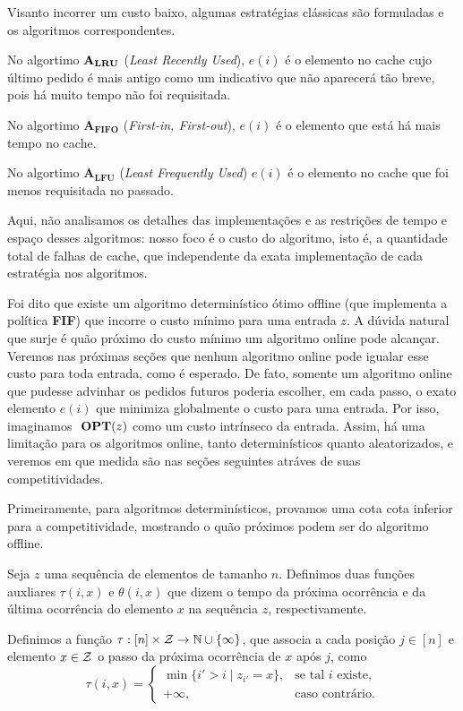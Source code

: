 Visanto incorrer um custo baixo, algumas estratégias clássicas são formuladas e os algoritmos correspondentes.  

No algortimo \(\mathbf{A_{LRU}}\) (\textit{Least Recently Used}), \(e(i)\) é o elemento no cache cujo último pedido é mais antigo como um indicativo que não aparecerá tão breve, pois há muito tempo não foi requisitada.

No algortimo \(\mathbf{A_{FIFO}}\) (\textit{First-in, First-out}), \(e(i)\) é o elemento que está há mais tempo no cache. 

No algortimo \(\mathbf{A_{LFU}}\) (\textit{Least Frequently Used}) \(e(i)\) é o elemento no cache que foi menos requisitada no passado.

Aqui, não analisamos os detalhes das implementações e as restrições de tempo e espaço desses algoritmos: nosso foco é o custo do algoritmo, isto é, a quantidade total de falhas de cache, que independente da exata implementação de cada estratégia nos algoritmos.

Foi dito que existe um algoritmo determinístico ótimo offline (que implementa a política \textbf{FIF}) que incorre o custo mínimo para uma entrada \(z\). A dúvida natural que surje é quão próximo do custo mínimo um algoritmo online pode alcançar. Veremos nas próximas seções que nenhum algoritmo online pode igualar esse custo para toda entrada, como é esperado. De fato, somente um algoritmo online que pudesse advinhar os pedidos futuros poderia escolher, em cada passo, o exato elemento \(e(i)\) que minimiza globalmente o custo para uma entrada. Por isso, imaginamos \(\ \textbf{OPT}(z)\) como um custo intrínseco da entrada. Assim, há uma limitação para os algoritmos online, tanto determinísticos quanto aleatorizados, e veremos em que medida são nas seções seguintes atráves de suas competitividades.

Primeiramente, para algoritmos determinísticos, provamos uma cota cota inferior para a competitividade, mostrando o quão próximos podem ser do algoritmo offline. 

Seja \(z\) uma sequência de elementos de tamanho \(n\). Definimos duas funções auxliares \(\tau(i,x)\) e \(\theta(i,x)\) que dizem o tempo da próxima ocorrência e da última ocorrência do elemento \(x\) na sequência \(z\), respectivamente.

\begin{definition}
 Definimos a função \(\tau : [n] \times \mathcal{Z} \to \mathbb{N} \cup \{\infty\}\), que associa a cada posição \(j \in [n]\) e elemento \(x \in \mathcal{Z}\) o passo da próxima ocorrência de \(x\) após \(j\), como
\begin{equation}
\tau(i, x) =
\begin{cases}
  \min \{ i' > i \mid z_{i'} = x \}, & \text{se tal } i \text{ existe}, \\
  +\infty, & \text{caso contrário}.
\end{cases}
\end{equation}
\end{definition}

